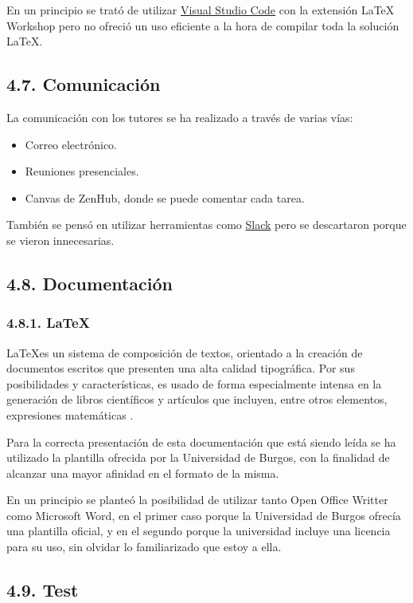En un principio se trató de utilizar \href{https://code.visualstudio.com/}{Visual Studio Code} con la extensión LaTeX Workshop pero no ofreció un uso eficiente a la hora de compilar toda la solución \LaTeX.

\subsection{4.7. Comunicación}

La comunicación con los tutores se ha realizado a través de varias vías:
\begin{itemize}
	\item Correo electrónico.
	\item Reuniones presenciales. 
	\item Canvas de ZenHub, donde se puede comentar cada tarea.
\end{itemize}

También se pensó en utilizar herramientas como \href{https://slack.com/intl/es-es/}{Slack} pero se descartaron porque se vieron innecesarias.

\subsection{4.8. Documentación}

\subsubsection{4.8.1. LaTeX}

\LaTeX es un sistema de composición de textos, orientado a la creación de documentos escritos que presenten una alta calidad tipográfica. Por sus posibilidades y características, es usado de forma especialmente intensa en la generación de libros científicos y artículos que incluyen, entre otros elementos, expresiones matemáticas \cite{wiki:latex}.

Para la correcta presentación de esta documentación que está siendo leída se ha utilizado la plantilla ofrecida por la Universidad de Burgos, con la finalidad de alcanzar una mayor afinidad en el formato de la misma.

En un principio se planteó la posibilidad de utilizar tanto Open Office Writter como Microsoft Word, en el primer caso porque la Universidad de Burgos ofrecía una plantilla oficial, y en el segundo porque la universidad incluye una licencia para su uso, sin olvidar lo familiarizado que estoy a ella.

\subsection{4.9. Test}

